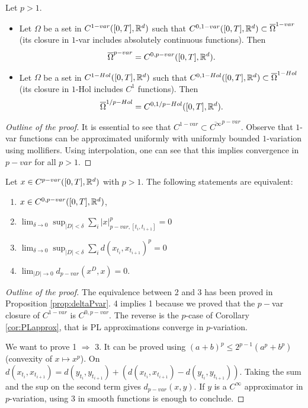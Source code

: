 \begin{lemma}
    Let $p > 1.$
    \begin{itemize}
        \item Let $\Omega$ be a set in $C^{1-var}([0,T],\mathbb{R}^d)$ such that $C^{0,1-var}([0,T],\mathbb{R}^d) \subset \overline{\Omega}^{1-var}$ (its closure in $1$-var includes absolutely continuous functions). Then
        \begin{equation}
            \overline{\Omega}^{p-var} = C^{0, p-var}([0,T], \mathbb{R}^d).
        \end{equation}
        \item Let $\Omega$ be a set in $C^{1-Hol}([0,T],\mathbb{R}^d)$ such that $C^{0,1-Hol}([0,T],\mathbb{R}^d) \subset \overline{\Omega}^{1-Hol}$ (its closure in $1$-Hol includes $C^1$ functions). Then
        \begin{equation}
            \overline{\Omega}^{1/p-Hol} = C^{0, 1/p-Hol}([0,T], \mathbb{R}^d).
        \end{equation}
    \end{itemize}
\end{lemma}
\begin{proof}[Outline of the proof]
    It is essential to see that $C^{1-var} \subset \overline{C^\infty}^{p-var}.$
    Observe that $1$-var functions can be approximated uniformly with uniformly bounded $1$-variation using mollifiers. Using interpolation, one can see that this implies convergence in $p-var$ for all $p > 1.$
\end{proof}

\begin{theorem}
    Let $x \in C^{p-var}([0,T], \mathbb{R}^d)$ with $p > 1.$ The following statements are equivalent:
    \begin{enumerate}
        \item $x \in C^{0,p-var}([0,T], \mathbb{R}^d)$,
        \item $\lim_{\delta \rightarrow 0} \sup_{|D| < \delta} \sum_i |x|_{p-var,[t_i, t_{i+1}]}^p = 0$
        \item $\lim_{\delta \rightarrow 0} \sup_{|D| < \delta} \sum_i d(x_{t_i}, x_{t_{i+1}})^p = 0$
        \item $\lim_{|D| \rightarrow 0} d_{p-var}(x^D, x) = 0.$
    \end{enumerate}
\end{theorem}
\begin{proof}[Outline of the proof]
    The equivalence between 2 and 3 has been proved in Proposition \ref{prop:deltaPvar}.
    4 implies 1 because we proved that the $p-$var closure of $C^{1-var}$ is $C^{0,p-var}$.
    The reverse is the $p$-case of Corollary \ref{cor:PLapprox}, that is PL approximations converge in $p$-variation. 

    We want to prove 1 $\Rightarrow$ 3.
    It can be proved using $(a + b)^p \leq 2^{p-1} (a^p + b^p)$ (convexity of $x \mapsto x^p$).
    On $d(x_{t_i},x_{t_{i+1}}) = d(y_{t_i}, y_{t_{i+1}}) + (d(x_{t_i}, x_{t_{i+1}}) - d(y_{t_i}, y_{t_{i+1}}))$.
    Taking the sum and the sup on the second term gives $d_{p-var}(x,y)$.
    If $y$ is a $C^\infty$ approximator in $p$-variation, using 3 in smooth functions is enough to conclude.
\end{proof}


